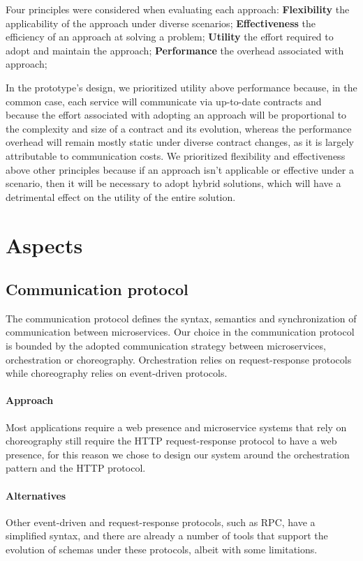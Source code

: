 Four principles were considered when evaluating each approach:
\textbf{Flexibility} the applicability of the approach under diverse scenarios;
\textbf{Effectiveness} the efficiency of an approach at solving a problem;
\textbf{Utility} the effort required to adopt and maintain the approach;
\textbf{Performance} the overhead associated with approach;

In the prototype's design, we prioritized utility above performance because,
in the common case, each service will communicate via up-to-date contracts and
because the effort associated with adopting an approach will be proportional to the complexity and size of a contract and its evolution,
whereas the performance overhead will remain mostly static under diverse contract changes, as it is largely attributable to communication costs.
We prioritized flexibility and effectiveness above other principles because if an approach isn't applicable or effective under a scenario,
then it will be necessary to adopt hybrid solutions, which will have a detrimental effect on the utility of the entire solution.

\section{Aspects} %
\label{sec:aspects}

\subsection{Communication protocol} %
\label{sec:communication_protocol}

The communication protocol defines the syntax, semantics and synchronization of communication between microservices.
Our choice in the communication protocol is bounded by the adopted communication strategy between microservices, orchestration or choreography.
Orchestration relies on request-response protocols while choreography relies on event-driven protocols.

\paragraph{Approach}
Most applications require a web presence and microservice systems that
rely on choreography still require the HTTP request-response protocol to have a web presence,
for this reason we chose to design our system around the orchestration pattern and the HTTP protocol.

\paragraph{Alternatives}
Other event-driven and request-response protocols, such as RPC, have a simplified
syntax, and there are already a number of tools that support the evolution of schemas
under these protocols, albeit with some limitations.

